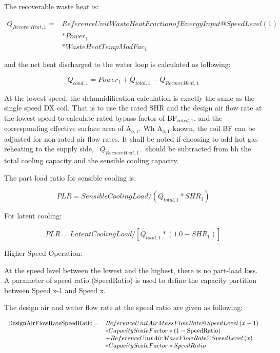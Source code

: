 The recoverable waste heat is:

\begin{equation}
  \begin{array}{rl}
    Q_{RecoverHeat,1} =& ReferenceUnitWasteHeatFractionofEnergyInput@SpeedLevel\left( 1 \right) \\
                      &* Power_1 \\
                      &* WasteHeatTempModFac_1
  \end{array}
\end{equation}

and the net heat discharged to the water loop is calculated as following:

\begin{equation}
{Q_{cond,1}} = Powe{r_1} + {Q_{total,1}} - {Q_{RecoverHeat,1}}
\end{equation}

At the lowest speed, the dehumidification calculation is exactly the same as the single speed DX coil. That is to use the rated SHR and the design air flow rate at the lowest speed to calculate rated bypass factor of BF\(_{rated,1}\), and the corresponding effective surface area of A\(_{o,1}\). Wh A\(_{o,1}\) known, the coil BF can be adjusted for non-rated air flow rates. It shall be noted if choosing to add hot gas reheating to the supply side,~ \({Q_{RecoverHeat,1}}\) ~should be subtracted from bh the total cooling capacity and the sensible cooling capacity.

The part load ratio for sensible cooling is:

\begin{equation}
PLR = SensibleCoolingLoad/({Q_{total,1}}*SH{R_1})
\end{equation}

For latent cooling:

\begin{equation}
PLR = LatentCoolingLoad/[{Q_{total,1}}*(1.0 - SH{R_1})]
\end{equation}

Higher Speed Operation:

At the speed level between the lowest and the highest, there is no part-load loss. A parameter of speed ratio (SpeedRatio) is used to define the capacity partition between Speed x-1 and Speed x.

The design air and water flow rate at the speed ratio are given as following:

\begin{equation}
  \begin{array}{rl}
    {\rm{DesignAirFlowRateSpeedRatio}} =& ReferenceUnitAirMassFlowRate@SpeedLevel\left( {x - 1} \right) \\
                                       &* CapacityScaleFactor * \left( {1-\rm{SpeedRatio}} \right) \\
                                       &+ ReferenceUnitAirMassFlowRate@SpeedLevel\left( x \right) \\
                                       &* CapacityScaleFactor * SpeedRatio
  \end{array}
\end{equation}

